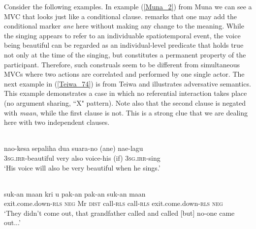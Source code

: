Consider the following examples. In example (\ref{Muna_2}) from Muna we can see a MVC that looks just like a conditional clause. \citet{vandenberg1989} remarks that one may add the conditional marker \textit{ane} here without making any change to the meaning. While the singing appears to refer to an individuable spatiotemporal event, the voice being beautiful can be regarded as an individual-level predicate that holds true not only at the time of the singing, but constitutes a permanent property of the participant. Therefore, such construals seem to be different from simultaneous MVCs where two actions are correlated and performed by one single actor. The next example in (\ref{Teiwa_74}) is from Teiwa and illustrates adversative semantics. This example  demonstrates a case in which no referential interaction takes place (no argument sharing, ``X" pattern). Note also that the second clause is negated with \textit{maan}, while the first clause is not. This is a strong clue that we are dealing here with two independent clauses.

\ea \label{Muna_2}
\\
\gll nao-kesa sepaliha dua suara-no (ane) nae-lagu \\
3\textsc{sg}.\textsc{irr}-beautiful very also voice-his (if) 3\textsc{sg}.\textsc{irr}-sing \\
\glft `His voice will also be very beautiful when he sings.'\\ 
\z

\ea \label{Teiwa_74}
\\
\gll suk-an maan kri u pak-an pak-an suk-an maan \\
exit.come.down-\textsc{rls} \textsc{neg} Mr \textsc{dist} call-\textsc{rls} call-\textsc{rls} exit.come.down-\textsc{rls} \textsc{neg} \\
\glft `They didn't come out, that grandfather called and called [but] no-one came out...'\\ 
\z

